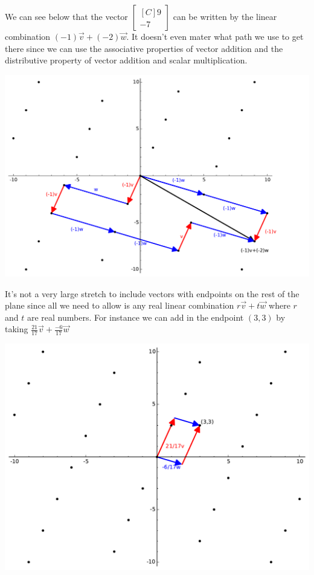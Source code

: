 \begin{example}
We can see below that the vector $\begin{bmatrix*}[C]9 \\ -7 \end{bmatrix*}$ can be written by the linear combination $(-1)\vec{v}+(-2)\vec{w}$. It doesn't even mater what path we use to get there since we can use the associative properties of vector addition and the distributive property of vector addition and scalar multiplication.
\begin{center}
\includegraphics[scale=.5]{Rn/vw_9n7_graph1.pdf}
\end{center}

It's not a very large stretch to include vectors with endpoints on the rest of the plane since all we need to allow is any real linear combination $r\vec{v}+t\vec{w}$ where $r$ and $t$ are real numbers. For instance we can add in the endpoint $(3,3)$ by taking $\frac{21}{17}\vec{v}+\frac{-6}{17}\vec{w}$\\
\begin{center}
\includegraphics[scale=.5]{Rn/vw_graph2.pdf}\
\end{center}
\end{example}

